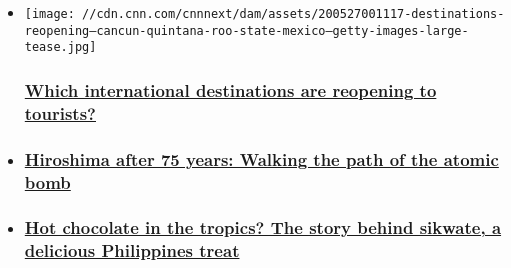 \begin{itemize}
\item
  \href{/travel/article/global-destinations-reopening-to-tourists/index.html}{}

  \texttt{[image: //cdn.cnn.com/cnnnext/dam/assets/200527001117-destinations-reopening---cancun-quintana-roo-state-mexico---getty-images-large-tease.jpg]}

  \hypertarget{which-international-destinations-are-reopening-to-tourists}{%
  \subsubsection{\texorpdfstring{\href{/travel/article/global-destinations-reopening-to-tourists/index.html}{Which
  international destinations are reopening to
  tourists?}}{Which international destinations are reopening to tourists?}}\label{which-international-destinations-are-reopening-to-tourists}}
\item
  \hypertarget{hiroshima-after-75-years-walking-the-path-of-the-atomic-bomb}{%
  \subsubsection{\texorpdfstring{\href{/travel/article/hiroshima-atomic-bomb-75th-anniversary-intl-hnk/index.html}{Hiroshima
  after 75 years: Walking the path of the atomic
  bomb}}{Hiroshima after 75 years: Walking the path of the atomic bomb}}\label{hiroshima-after-75-years-walking-the-path-of-the-atomic-bomb}}
\item
  \hypertarget{hot-chocolate-in-the-tropics-the-story-behind-sikwate-a-delicious-philippines-treat}{%
  \subsubsection{\texorpdfstring{\href{/travel/article/philippines-sikwate-chocolate/index.html}{Hot
  chocolate in the tropics? The story behind sikwate, a delicious
  Philippines
  treat}}{Hot chocolate in the tropics? The story behind sikwate, a delicious Philippines treat}}\label{hot-chocolate-in-the-tropics-the-story-behind-sikwate-a-delicious-philippines-treat}}
\end{itemize}


